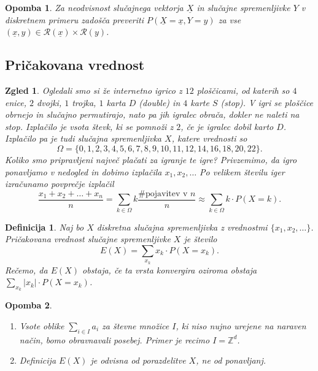 \documentclass[10pt, a4paper]{article}
\newtheorem{defi}[izr]{Definicija}
\newenvironment{noticeB}{%
  \tcolorbox[%
  notitle,
  empty,
  enhanced,  %
  breakable,
  coltext=black,
  colback=white, 
  fontupper=\rmfamily,
  parbox=false,
  noparskip,
  sharp corners,
  boxrule=-1pt,  %
  frame hidden,
  left=7pt,  %
  right=7pt,
  top=5pt,
  bottom=5pt,
  before skip=2.5ex plus 2pt,
  after skip=2.5ex plus 2pt,
  borderline west = {1.5pt}{-0.1pt}{blue!30!black}, %
  overlay unbroken and last={%
    \draw[color=black, line width=1.25pt]
    ($(frame.south west)+(1.pt, -0.1pt)$) -- ++(2em, 0);
  }
  ]}
{\endtcolorbox}
\newenvironment{definicija}{\begin{defi}\begin{noticeB}}{%
    \end{noticeB}\end{defi}}
\newtheorem*{opomba}{Opomba}
\newtheorem{zgled}[izr]{Zgled}
\newcommand{\Z}{\mathbb {Z}}
\begin{document}
\begin{opomba}
  Za neodvisnost slučajnega vektorja $\underline{X}$ in slučajne spremenljivke $Y$
  v diskretnem primeru zadošča preveriti $P(\underline{X} = \underline{x}, Y = y)$
  za vse $(\underline{x}, y) \in \mathcal{R} (\underline{x}) \times \mathcal{R} (y)$.
\end{opomba}

\subsection{Pričakovana vrednost}

\begin{zgled}
  Ogledali smo si že internetno igrico z $12$ ploščicami, od katerih so $4$ enice,
  $2$ dvojki, $1$ trojka, $1$ karta $D$ (double) in $4$ karte $S$ (stop).
  V igri se ploščice obrnejo in slučajno permutirajo, nato pa jih igralec obrača, dokler ne naleti na stop.
  Izplačilo je vsota števk, ki se pomnoži z $2$, če je igralec dobil karto $D$.
  Izplačilo pa je tudi slučajna spremenljivka $X$, katere vrednosti so 
  $$\Omega = \{0, 1, 2, 3, 4, 5, 6,7, 8, 9, 10, 11, 12, 14, 16, 18, 20, 22\}.$$
  Koliko smo pripravljeni največ plačati za igranje te igre?
  Privzemimo, da igro ponavljamo v nedogled in dobimo izplačila $x_1, x_2, \dots$
  Po velikem številu iger izračunamo povprečje izplačil 
  $$\frac{x_1 + x_2 + \dots + x_n}{n} = \sum_{k \in \Omega} k \frac{\text{\# pojavitev v $n$}}{n} \approx \sum_{k \in \Omega} k \cdot P(X = k).$$
\end{zgled}

\begin{definicija}
  Naj bo $X$ diskretna slučajna spremenljivka z vrednostmi $\{x_1, x_2, \dots\}$.
  Pričakovana vrednost slučajne spremenljivke $X$ je število 
  $$E(X) = \sum_{x_k} x_k \cdot P(X = x_k).$$
  Rečemo, da $E(X)$ obstaja, če ta vrsta konvergira oziroma obstaja $\sum_{x_k} |x_k| \cdot P(X = x_k)$.
\end{definicija}

\begin{opomba}
  \begin{enumerate}
    \item Vsote oblike $\sum_{i \in I} a_i$ za števne množice $I$, ki niso nujno urejene 
    na naraven način, bomo obravnavali posebej. Primer je recimo $I = \Z^d$.
    \item Definicija $E(X)$ je odvisna od porazdelitve $X$, ne od ponavljanj.
  \end{enumerate}
\end{opomba}
\end{document}
